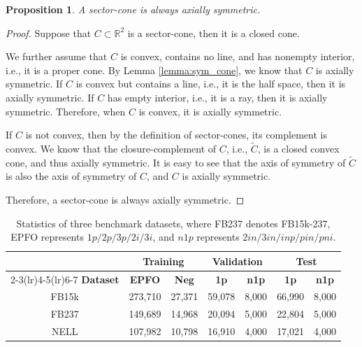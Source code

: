 \documentclass{article}
\newtheorem{prop}{Proposition}
\begin{document}
\begin{prop}\label{appendix_prop:axial}
A sector-cone is always axially  symmetric.
\end{prop}
\vspace{-5mm}
\begin{proof}
Suppose that $C\subset\mathbb{R}^2$ is a sector-cone, then it is a closed cone. 

We further assume that $C$ is convex, contains no line, and has nonempty interior, i.e., it is a proper cone. By Lemma \ref{lemma:sym_cone}, we know that $C$ is axially symmetric. If $C$ is convex but contains a line, i.e., it is the half space, then it is axially symmetric. If $C$ has empty interior, i.e., it is a ray, then it is axially symmetric. Therefore, when $C$ is convex, it is axially symmetric.

If $C$ is not convex, then by the definition of sector-cones, its complement is convex. We know that the closure-complement of $C$, i.e., $\tilde{C}$, is a closed convex cone, and thus axially symmetric. It is easy to see that the axis of symmetry of $\tilde{C}$ is also the axis of symmetry of $C$, and $C$ is axially symmetric.

Therefore, a sector-cone is always axially symmetric.
\end{proof}

\begin{table}[ht]
    \caption{Statistics of three benchmark datasets, where FB237 denotes FB15k-237, EPFO represents $1p/2p/3p/2i/3i$, and $n1p$ represents $2in/3in/inp/pin/pni$.}
    \vspace{1mm}
    \label{table:datasets}
    \centering
    
    \begin{tabular}{c *{6}{c}}
        \toprule
         & \multicolumn{2}{c}{\textbf{Training}} & \multicolumn{2}{c}{\textbf{Validation}} & \multicolumn{2}{c}{\textbf{Test}} \\
         \cmidrule(lr){2-3}\cmidrule(lr){4-5}\cmidrule(lr){6-7}
        \textbf{Dataset} & \textbf{EPFO} &\textbf{Neg} & \textbf{1p} &\textbf{n1p} & \textbf{1p} &\textbf{n1p}\\
        \midrule
        FB15k & 273,710 &27,371 & 59,078 & 8,000 &66,990 & 8,000\\
        FB237 & 149,689 &14,968 & 20,094 & 5,000 &22,804 & 5,000\\
        NELL & 107,982 &10,798 & 16,910 & 4,000 &17,021 & 4,000\\
        \bottomrule
    \end{tabular}
\end{table}
\end{document}
